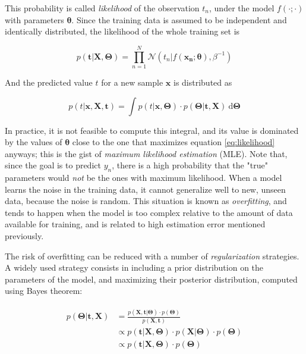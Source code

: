 \documentclass[a4paper]{book}
\begin{document}
This probability is called \emph{likelihood} of the observation $t_n$, under the model $f(\cdot;\cdot)$ with parameters $\bm{\theta}$. Since the training data is assumed to be independent and identically distributed, the likelihood of the whole training set is

\begin{equation}
\label{eq:likelihood}
p(\bm{t}\vert\bm{X}, \bm\Theta)=\prod_{n=1}^N  \mathcal{N}(t_n\vert f(\bm{x_n};\bm\theta),\beta^{-1})
\end{equation}

And the predicted value $t$ for a new sample $\bm x$ is distributed as

\begin{equation}
p(t\vert \bm x, \bm X, \bm t)=\int
p(t\vert\bm x,\bm\Theta)\cdot p(\bm\Theta\vert \bm t, \bm X)\ \text{d}\bm\Theta 
\end{equation}

In practice, it is not feasible to compute this integral, and its value is dominated by the values of $\bm\theta$ close to the one that maximizes equation \ref{eq:likelihood} anyways; this is the gist of \emph{maximum likelihood estimation} (MLE). Note that, since the goal is to predict $y_n$, there is a high probability that the "true" parameters would \emph{not} be the ones with maximum likelihood. When a model learns the noise in the training data, it cannot generalize well to new, unseen data, because the noise is random. This situation is known as \emph{overfitting}, and tends to happen when the model is too complex relative to the amount of data available for training, and is related to high estimation error mentioned previously.

The risk of overfitting can be reduced with a number of \emph{regularization} strategies. A widely used strategy consists in including a prior distribution on the parameters of the model, and maximizing their posterior distribution, computed using Bayes theorem:


\begin{align}
\begin{split}
\label{eq:map}
p(\bm\Theta\vert\bm t, \bm X)&=\frac{p(\bm X, \bm t\vert\bm\Theta)\cdot p(\bm\Theta)}{p(\bm X, \bm t)}\\
&\propto p(\bm t\vert \bm X,\bm\Theta)\cdot p(\bm X\vert\bm\Theta)\cdot p(\bm\Theta)\\
&\propto p(\bm t\vert \bm X,\bm\Theta)\cdot p(\bm\Theta)
\end{split}
\end{align}
\end{document}
